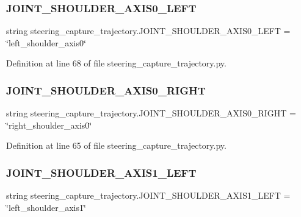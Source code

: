 \subsubsection{\texorpdfstring{JOINT\_SHOULDER\_AXIS0\_LEFT}{JOINT\_SHOULDER\_AXIS0\_LEFT}}
{\footnotesize\ttfamily string steering\+\_\+capture\+\_\+trajectory.\+J\+O\+I\+N\+T\+\_\+\+S\+H\+O\+U\+L\+D\+E\+R\+\_\+\+A\+X\+I\+S0\+\_\+\+L\+E\+FT = \char`\"{}left\+\_\+shoulder\+\_\+axis0\char`\"{}}



Definition at line 68 of file steering\+\_\+capture\+\_\+trajectory.\+py.

\mbox{\label{namespacesteering__capture__trajectory_abe1b65eead7e08263756bbd4cb8a707d}} 
\subsubsection{\texorpdfstring{JOINT\_SHOULDER\_AXIS0\_RIGHT}{JOINT\_SHOULDER\_AXIS0\_RIGHT}}
{\footnotesize\ttfamily string steering\+\_\+capture\+\_\+trajectory.\+J\+O\+I\+N\+T\+\_\+\+S\+H\+O\+U\+L\+D\+E\+R\+\_\+\+A\+X\+I\+S0\+\_\+\+R\+I\+G\+HT = \char`\"{}right\+\_\+shoulder\+\_\+axis0\char`\"{}}



Definition at line 65 of file steering\+\_\+capture\+\_\+trajectory.\+py.

\mbox{\label{namespacesteering__capture__trajectory_a54818ddd4d017c6522d3e96954fb159d}} 
\subsubsection{\texorpdfstring{JOINT\_SHOULDER\_AXIS1\_LEFT}{JOINT\_SHOULDER\_AXIS1\_LEFT}}
{\footnotesize\ttfamily string steering\+\_\+capture\+\_\+trajectory.\+J\+O\+I\+N\+T\+\_\+\+S\+H\+O\+U\+L\+D\+E\+R\+\_\+\+A\+X\+I\+S1\+\_\+\+L\+E\+FT = \char`\"{}left\+\_\+shoulder\+\_\+axis1\char`\"{}}



